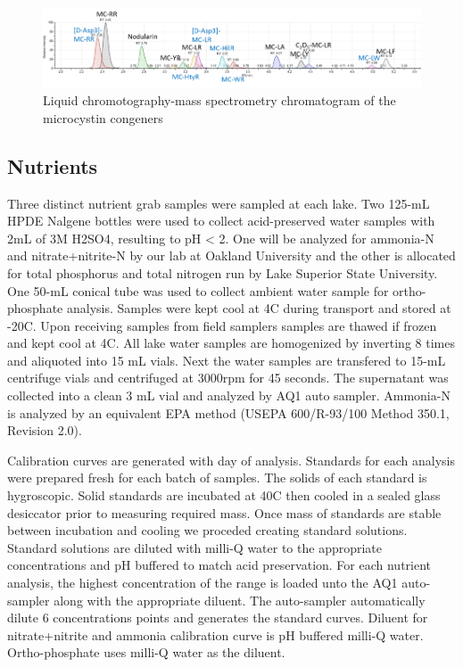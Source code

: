 \documentclass{ou-thesis}
\begin{document}
\begin{figure}[h]
  \includegraphics{LCMS_CONGENERS}
  \caption{Liquid chromotography-mass spectrometry chromatogram of the microcystin congeners}
  \label{spectra}
\end{figure}

\subsection{Nutrients}


Three distinct nutrient grab samples were sampled at each lake. Two 125-mL HPDE Nalgene bottles were used to collect acid-preserved water samples with 2mL of 3M H2SO4, resulting to pH < 2. One will be analyzed for ammonia-N and nitrate+nitrite-N by our lab at Oakland University and the other is allocated for total phosphorus and total nitrogen run by Lake Superior State University. One 50-mL conical tube was used to collect ambient water sample for ortho-phosphate analysis. Samples were kept cool at 4C during transport and stored at -20C. Upon receiving samples from field samplers samples are thawed if frozen and kept cool at 4C. All lake water samples are homogenized by inverting 8 times and aliquoted into 15 mL vials. Next the water samples are transfered to 15-mL centrifuge vials and centrifuged at 3000rpm for 45 seconds. The supernatant was collected into a clean 3 mL vial and analyzed by AQ1 auto sampler. Ammonia-N is analyzed by an equivalent EPA method (USEPA 600/R-93/100 Method 350.1, Revision 2.0).

Calibration curves are generated with day of analysis. Standards for each analysis were prepared fresh for each batch of samples. The solids of each standard is hygroscopic. Solid standards are incubated at 40C then cooled in a sealed glass desiccator prior to measuring required mass. Once mass of standards are stable between incubation and cooling we proceded creating standard solutions. Standard solutions are diluted with milli-Q water to the appropriate concentrations and pH buffered to match acid preservation. For each nutrient analysis, the highest concentration of the range is loaded unto the AQ1 auto-sampler along with the appropriate diluent. The auto-sampler automatically dilute 6 concentrations points and generates the standard curves. Diluent for nitrate+nitrite and ammonia calibration curve is pH buffered milli-Q water. Ortho-phosphate uses milli-Q water as the diluent.
\end{document}
